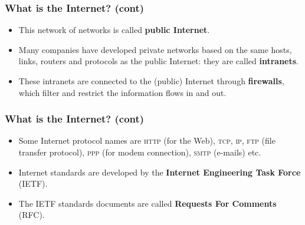 %
\begin{frame}
\frametitle{What is the Internet? (cont)}

\begin{itemize}

  \item This network of networks is called \textbf{public Internet}. 

  \item Many companies have developed private networks based on the
  same hosts, links, routers and protocols as the public Internet:
  they are called \textbf{intranets}. 

  \item These intranets are connected to the (public) Internet
  through \textbf{firewalls}, which filter and restrict the
  information flows in and out.

\end{itemize}

\end{frame}

%
\begin{frame}
\frametitle{What is the Internet? (cont)}

\begin{itemize}

  \item Some Internet protocol names are \textsc{http} (for the Web),
  \textsc{tcp}, \textsc{ip}, \textsc{ftp} (file transfer protocol),
  \textsc{ppp} (for modem connection), \textsc{smtp} (e-mails) etc.

  \item Internet standards are developed by the \textbf{Internet
  Engineering Task Force} (IETF).

  \item The IETF standards documents are called \textbf{Requests For
  Comments} (RFC).

\end{itemize}

\end{frame}

